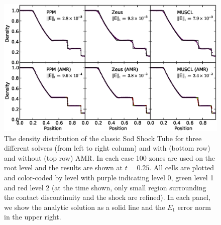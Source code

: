\begin{figure}
\begin{center}
\includegraphics[width=\textwidth]{figures/SodShockTube.eps}
\caption{The density distribution of the classic Sod Shock Tube for
three different solvers (from left to right column) and with (bottom
row) and without (top row) AMR.  In each case 100 zones are used on
the root level and the results are shown at $t=0.25$.  All cells are
plotted and color-coded by level with purple 
indicating level 0, green level 1 and red level 2 (at the time shown, only small region
surrounding the contact discontinuity and the shock are refined).  In
each panel, we show the analytic solution as a solid line and the $E_1$
error norm in the upper right.}
\label{fig.sodshocktube}
\end{center}
\end{figure}


